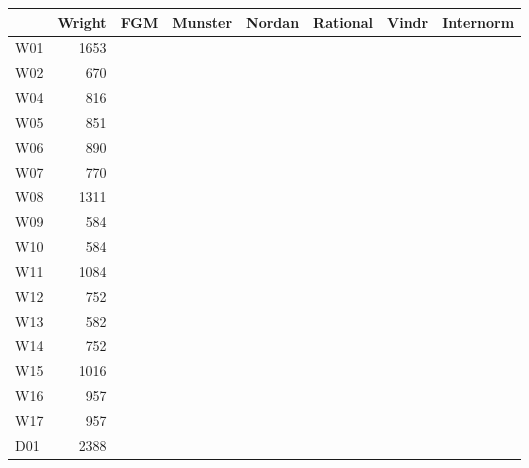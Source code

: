\begin{tabular}{|p{4cm}||r|r|r|r|r|r|r|}
\hline
            &Wright     &FGM       &Munster &Nordan  &Rational   &Vindr  &Internorm         
\\ \hline
W01         &1653       &          &        &        &           &       &                              
\\ \hline
W02         &670        &          &        &        &           &       &                            
\\ \hline
W04         &816        &          &        &        &           &       &                     
\\ \hline
W05         &851        &          &        &        &           &       &                    
\\ \hline
W06         &890        &          &        &        &           &       &                    
\\ \hline
W07         &770        &          &        &        &           &       &                    
\\ \hline
W08         &1311       &          &        &        &           &       &                     
\\ \hline
W09         &584        &          &        &        &           &       &                    
\\ \hline
W10         &584        &          &        &        &           &       &                     
\\ \hline
W11         &1084       &          &        &        &           &       &                     
\\ \hline
W12         &752        &          &        &        &           &       &               
\\ \hline
W13         &582        &          &        &        &           &       &                   
\\ \hline
W14         &752        &          &        &        &           &       &                    
\\ \hline
W15         &1016       &          &        &        &           &       &                     
\\ \hline
W16         &957        &          &        &        &           &       &                    
\\ \hline
W17         &957        &          &        &        &           &       &                    
\\ \hline
D01         &2388       &          &        &        &           &       &                     

\end{tabular}
